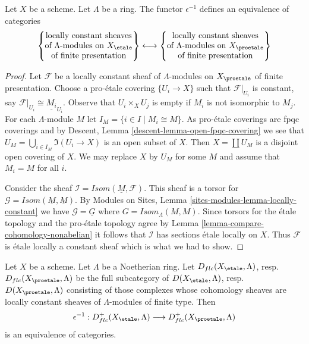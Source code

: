 \begin{lemma}
\label{lemma-compare-locally-constant}
Let $X$ be a scheme. Let $\Lambda$ be a ring.
The functor $\epsilon^{-1}$ defines an equivalence of categories
$$
\left\{
\begin{matrix}
\text{locally constant sheaves}\\
\text{of }\Lambda\text{-modules on }X_\etale\\
\text{of finite presentation}
\end{matrix}
\right\}
\longleftrightarrow
\left\{
\begin{matrix}
\text{locally constant sheaves}\\
\text{of }\Lambda\text{-modules on }X_\proetale\\
\text{of finite presentation}
\end{matrix}
\right\}
$$
\end{lemma}

\begin{proof}
Let $\mathcal{F}$ be a locally constant sheaf of $\Lambda$-modules
on $X_\proetale$ of finite presentation. Choose a pro-\'etale covering
$\{U_i \to X\}$ such that $\mathcal{F}|_{U_i}$ is constant, say
$\mathcal{F}|_{U_i} \cong \underline{M_i}_{U_i}$.
Observe that $U_i \times_X U_j$ is empty if $M_i$ is not isomorphic
to $M_j$.
For each $\Lambda$-module $M$ let $I_M = \{i \in I \mid M_i \cong M\}$.
As pro-\'etale coverings are fpqc coverings and by
Descent, Lemma \ref{descent-lemma-open-fpqc-covering}
we see that $U_M = \bigcup_{i \in I_M} \Im(U_i \to X)$
is an open subset of $X$. Then $X = \coprod U_M$ is a disjoint
open covering of $X$. We may replace $X$ by $U_M$ for some $M$ and
assume that $M_i = M$ for all $i$.

\medskip\noindent
Consider the sheaf $\mathcal{I} = \mathit{Isom}(\underline{M}, \mathcal{F})$.
This sheaf is a torsor for
$\mathcal{G} = \mathit{Isom}(\underline{M}, \underline{M})$.
By Modules on Sites, Lemma \ref{sites-modules-lemma-locally-constant}
we have $\mathcal{G} = \underline{G}$
where $G = \mathit{Isom}_\Lambda(M, M)$.
Since torsors for the \'etale topology
and the pro-\'etale topology agree by
Lemma \ref{lemma-compare-cohomology-nonabelian}
it follows that $\mathcal{I}$ has sections \'etale locally on $X$.
Thus $\mathcal{F}$ is \'etale locally a constant sheaf which is
what we had to show.
\end{proof}

\begin{lemma}
\label{lemma-compare-locally-constant-derived}
Let $X$ be a scheme. Let $\Lambda$ be a Noetherian ring.
Let $D_{flc}(X_\etale, \Lambda)$, resp.\ $D_{flc}(X_\proetale, \Lambda)$
be the full subcategory of
$D(X_\etale, \Lambda)$, resp.\ $D(X_\proetale, \Lambda)$
consisting of those complexes whose cohomology sheaves are locally
constant sheaves of $\Lambda$-modules of finite type. Then
$$
\epsilon^{-1} :
D_{flc}^+(X_\etale, \Lambda)
\longrightarrow
D_{flc}^+(X_\proetale, \Lambda)
$$
is an equivalence of categories.
\end{lemma}

